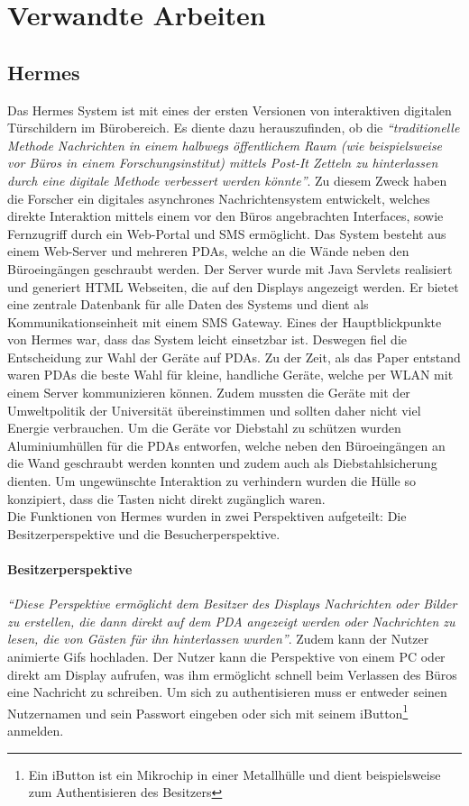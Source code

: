 \chapter{Verwandte Arbeiten}
\section{Hermes}
Das Hermes System\cite{cheverest:2003:paper}\cite{cheverest:2003:article}\cite{cheveres:2005:hermes-bluetooth}\cite{cheverest:2012} ist mit eines der ersten Versionen von interaktiven digitalen Türschildern im Bürobereich.
Es diente dazu herauszufinden, ob die \textit{``traditionelle Methode Nachrichten in einem halbwegs öffentlichem Raum (wie beispielsweise vor Büros in einem Forschungsinstitut) mittels Post-It Zetteln zu hinterlassen durch eine digitale Methode verbessert werden könnte''}\cite{cheverest:2003:paper}.
Zu diesem Zweck haben die Forscher ein digitales asynchrones Nachrichtensystem entwickelt, welches direkte Interaktion mittels einem vor den Büros angebrachten Interfaces, sowie Fernzugriff durch ein Web-Portal und SMS ermöglicht.
Das System besteht aus einem Web-Server und mehreren PDAs, welche an die Wände neben den Büroeingängen geschraubt werden.
Der Server wurde mit Java Servlets realisiert und generiert HTML Webseiten, die auf den Displays angezeigt werden. Er bietet eine zentrale Datenbank für alle Daten des Systems und dient als Kommunikationseinheit mit einem SMS Gateway.
Eines der Hauptblickpunkte von Hermes war, dass das System leicht einsetzbar ist. Deswegen fiel die Entscheidung zur Wahl der Geräte auf PDAs. Zu der Zeit, als das Paper entstand waren PDAs die beste Wahl für kleine, handliche Geräte, welche per WLAN mit einem Server kommunizieren können. Zudem mussten die Geräte mit der Umweltpolitik der Universität übereinstimmen und sollten daher nicht viel Energie verbrauchen.
Um die Geräte vor Diebstahl zu schützen wurden Aluminiumhüllen für die PDAs entworfen, welche neben den Büroeingängen an die Wand geschraubt werden konnten und zudem auch als Diebstahlsicherung dienten. Um ungewünschte Interaktion zu verhindern wurden die Hülle so konzipiert, dass die Tasten nicht direkt zugänglich waren.\\

Die Funktionen von Hermes wurden in zwei Perspektiven aufgeteilt: Die Besitzerperspektive und die Besucherperspektive.
\subsubsection{Besitzerperspektive}
\textit{``Diese Perspektive ermöglicht dem Besitzer des Displays Nachrichten oder Bilder zu erstellen, die dann direkt auf dem PDA angezeigt werden oder Nachrichten zu lesen, die von Gästen für ihn hinterlassen wurden''}\cite{cheverest:2003:paper}. Zudem kann der Nutzer animierte Gifs hochladen.
Der Nutzer kann die Perspektive von einem PC oder direkt am Display aufrufen, was ihm ermöglicht schnell beim Verlassen des Büros eine Nachricht zu schreiben. Um sich zu authentisieren muss er entweder seinen Nutzernamen und sein Passwort eingeben oder sich mit seinem iButton\footnote{Ein iButton ist ein Mikrochip in einer Metallhülle und dient beispielsweise zum Authentisieren des Besitzers\cite{iButton:website}} anmelden.
